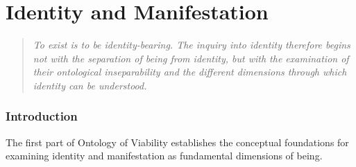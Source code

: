 
%
%
%
%
%
%
%



\part{Identity and Manifestation}
\label{part:identity-and-manifestation}



\def\CurrentPartID{VS.B01.P01}
\def\CurrentPartTitle{Identity and Manifestation}



\begin{quote}
\textit{
To exist is to be identity-bearing. The inquiry into
identity therefore begins not with the separation of
being from identity, but with the examination of their
ontological inseparability and the different dimensions
through which identity can be understood.
}
\end{quote}



\section*{Introduction}

The first part of Ontology of Viability establishes
the conceptual foundations for examining identity
and manifestation as fundamental dimensions of being.

